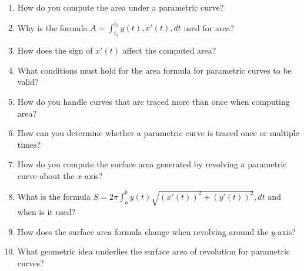 \begin{enumerate}
\item How do you compute the area under a parametric curve?

\item Why is the formula $A = \int_{t_1}^{t_2} y(t),x'(t),dt$ used for area?

\item How does the sign of $x'(t)$ affect the computed area?

\item What conditions must hold for the area formula for parametric curves to be valid?

\item How do you handle curves that are traced more than once when computing area?

\item How can you determine whether a parametric curve is traced once or multiple times?

\item How do you compute the surface area generated by revolving a parametric curve about the $x$-axis?

\item What is the formula $S = 2\pi \int_a^b y(t)\sqrt{(x'(t))^2 + (y'(t))^2},dt$ and when is it used?

\item How does the surface area formula change when revolving around the $y$-axis?

\item What geometric idea underlies the surface area of revolution for parametric curves?

\end{enumerate}
